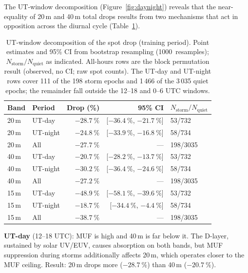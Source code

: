 \documentclass{agujournal2019}
\begin{document}
The UT-window decomposition (Figure~\ref{fig:daynight}) reveals that the
near-equality of 20\,m and 40\,m
total drops results from two mechanisms that act in opposition across the diurnal
cycle (Table~\ref{tab:daynight}).

\begin{table}[h]
	\centering
	\caption{UT-window decomposition of the spot drop
		(training period). Point estimates and 95\% CI from
		bootstrap resampling (\SI{1000}{resamples});
		$N_{\text{storm}} / N_{\text{quiet}}$ as indicated.
		All-hours rows are the block permutation result
		(observed, no CI; raw spot counts). The UT-day and UT-night rows cover 111 of the 198 storm
		epochs and 1\,466 of the 3\,035 quiet epochs; the remainder fall
		outside the 12--18 and 0--6 UTC windows.}
	\label{tab:daynight}
	\begin{tabular}{llrrl}
		\toprule
		Band & Period & Drop (\%) & 95\% CI & $N_{\text{storm}}/N_{\text{quiet}}$ \\
		\midrule
		20\,m & UT-day    & $\SI{-28.7}{\percent}$ & [$\SI{-36.4}{\percent}$, $\SI{-21.7}{\percent}$] & 53/732  \\
		20\,m & UT-night  & $\SI{-24.8}{\percent}$ & [$\SI{-33.9}{\percent}$, $\SI{-16.8}{\percent}$] & 58/734  \\
		20\,m & All    & $\SI{-27.7}{\percent}$ & --- & 198/3035 \\
		\midrule
		40\,m & UT-day    & $\SI{-20.7}{\percent}$ & [$\SI{-28.2}{\percent}$, $\SI{-13.7}{\percent}$] & 53/732  \\
		40\,m & UT-night  & $\SI{-30.2}{\percent}$ & [$\SI{-36.4}{\percent}$, $\SI{-24.6}{\percent}$] & 58/734  \\
		40\,m & All    & $\SI{-27.2}{\percent}$ & --- & 198/3035 \\
		\midrule
		15\,m & UT-day    & $\SI{-48.9}{\percent}$ & [$\SI{-58.1}{\percent}$, $\SI{-39.6}{\percent}$] & 53/732  \\
		15\,m & UT-night  & $\SI{-18.7}{\percent}$ & [$\SI{-34.4}{\percent}$, $\SI{-4.4}{\percent}$]  & 58/734  \\
		15\,m & All    & $\SI{-38.7}{\percent}$ & --- & 198/3035 \\
		\bottomrule
	\end{tabular}
\end{table}

\textbf{UT-day} (12--18 UTC): MUF is high and 40\,m is far below it.
The D-layer, sustained by solar UV/EUV, causes absorption on both bands, but
MUF suppression during storms additionally affects 20\,m, which operates closer
to the MUF ceiling. Result: 20\,m drops more ($\SI{-28.7}{\percent}$) than
40\,m ($\SI{-20.7}{\percent}$).
\end{document}
